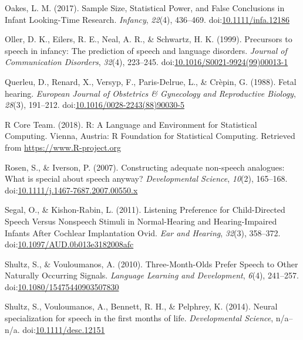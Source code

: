 \documentclass[man]{apa6}
\begin{document}
\hypertarget{ref-oakes_sample_2017}{}
Oakes, L. M. (2017). Sample Size, Statistical Power, and False
Conclusions in Infant Looking-Time Research. \emph{Infancy},
\emph{22}(4), 436--469.
doi:\href{https://doi.org/10.1111/infa.12186}{10.1111/infa.12186}

\hypertarget{ref-oller_precursors_1999}{}
Oller, D. K., Eilers, R. E., Neal, A. R., \& Schwartz, H. K. (1999).
Precursors to speech in infancy: The prediction of speech and language
disorders. \emph{Journal of Communication Disorders}, \emph{32}(4),
223--245.
doi:\href{https://doi.org/10.1016/S0021-9924(99)00013-1}{10.1016/S0021-9924(99)00013-1}

\hypertarget{ref-querleu_fetal_1988}{}
Querleu, D., Renard, X., Versyp, F., Paris-Delrue, L., \& Crèpin, G.
(1988). Fetal hearing. \emph{European Journal of Obstetrics \&
Gynecology and Reproductive Biology}, \emph{28}(3), 191--212.
doi:\href{https://doi.org/10.1016/0028-2243(88)90030-5}{10.1016/0028-2243(88)90030-5}

\hypertarget{ref-r_core_team_r:_2018}{}
R Core Team. (2018). R: A Language and Environment for Statistical
Computing. Vienna, Austria: R Foundation for Statistical Computing.
Retrieved from \url{https://www.R-project.org}

\hypertarget{ref-rosen_constructing_2007}{}
Rosen, S., \& Iverson, P. (2007). Constructing adequate non-speech
analogues: What is special about speech anyway? \emph{Developmental
Science}, \emph{10}(2), 165--168.
doi:\href{https://doi.org/10.1111/j.1467-7687.2007.00550.x}{10.1111/j.1467-7687.2007.00550.x}

\hypertarget{ref-segal_listening_2011}{}
Segal, O., \& Kishon-Rabin, L. (2011). Listening Preference for
Child-Directed Speech Versus Nonspeech Stimuli in Normal-Hearing and
Hearing-Impaired Infants After Cochlear Implantation Ovid. \emph{Ear and
Hearing}, \emph{32}(3), 358--372.
doi:\href{https://doi.org/10.1097/AUD.0b013e3182008afc}{10.1097/AUD.0b013e3182008afc}

\hypertarget{ref-shultz_three-month-olds_2010}{}
Shultz, S., \& Vouloumanos, A. (2010). Three-Month-Olds Prefer Speech to
Other Naturally Occurring Signals. \emph{Language Learning and
Development}, \emph{6}(4), 241--257.
doi:\href{https://doi.org/10.1080/15475440903507830}{10.1080/15475440903507830}

\hypertarget{ref-shultz_neural_2014}{}
Shultz, S., Vouloumanos, A., Bennett, R. H., \& Pelphrey, K. (2014).
Neural specialization for speech in the first months of life.
\emph{Developmental Science}, n/a--n/a.
doi:\href{https://doi.org/10.1111/desc.12151}{10.1111/desc.12151}
\end{document}
